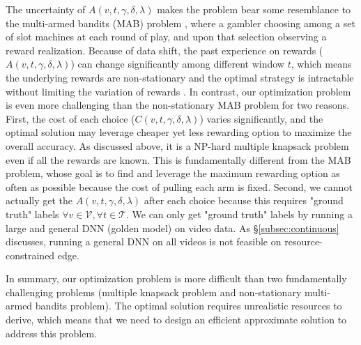 The uncertainty of $A(v, t, \gamma, \delta, \lambda)$ makes the problem bear some resemblance to the multi-armed bandits (MAB) problem \cite{robbins1952some}, where a gambler choosing among a set of slot machines at each round of play, and upon that selection observing a reward realization. 
Because of data shift, the past experience on rewards ($A(v, t, \gamma, \delta, \lambda)$) can change significantly among different window $t$, which means the underlying rewards are non-stationary and the optimal strategy is intractable without limiting the variation of rewards \cite{DBLP:conf/nips/GurZB14}. 
In contrast, our optimization problem is even more challenging than the non-stationary MAB problem for two reasons.
First, the cost of each choice ($C(v, t, \gamma, \delta, \lambda)$) varies significantly, and the optimal solution may leverage cheaper yet less rewarding option to maximize the overall accuracy.
As discussed above, it is a NP-hard multiple knapsack problem even if all the rewards are known. 
This is fundamentally different from the MAB problem, whose goal is to find and leverage the maximum rewarding option as often as possible because the cost of pulling each arm is fixed.
Second, we cannot actually get the $A(v, t, \gamma, \delta, \lambda)$ after each choice because this requires "ground truth" labels $\forall v \in \mathcal{V}, \forall t \in \mathcal{T}$. 
We can only get "ground truth" labels by running a large and general DNN (golden model) on video data. As \S\ref{subsec:continuous} discusses, running a general DNN on all videos is not feasible on resource-constrained edge.

In summary, our optimization problem is more difficult than two fundamentally challenging problems (multiple knapsack problem and non-stationary multi-armed bandits problem).  
The optimal solution requires unrealistic resources to derive, which means that we need to design an efficient approximate solution to address this problem.